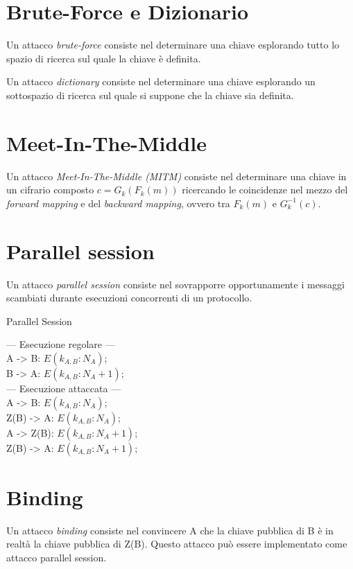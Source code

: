 \section{Brute-Force e Dizionario}
Un attacco \textit{brute-force} consiste nel determinare una chiave esplorando tutto lo spazio di ricerca sul quale la chiave è definita.

Un attacco \textit{dictionary} consiste nel determinare una chiave esplorando un sottospazio di ricerca sul quale si suppone che la chiave sia definita.

\section{Meet-In-The-Middle}
Un attacco \textit{Meet-In-The-Middle (MITM)} consiste nel determinare una chiave in un cifrario composto $c=G_{k}(F_{k}(m))$ ricercando le coincidenze nel mezzo del \textit{forward mapping} e del \textit{backward mapping}, ovvero tra $F_{k}(m)$ e $G_{k}^{-1}(c)$.

\section{Parallel session}
Un attacco \textit{parallel session} consiste nel sovrapporre opportunamente i messaggi scambiati durante esecuzioni concorrenti di un protocollo.

\bigskip
\begin{algorithm}[H]
  \caption{Parallel Session}
  \label{alg:attack-parallel-session}
  \SetAlgoNoLine
  --- Esecuzione regolare --- \\
  A -> B: $E(k_{A,B}:N_{A})$;\\
  B -> A: $E(k_{A,B}:N_{A}+1)$;\\
  --- Esecuzione attaccata --- \\
  A -> B: $E(k_{A,B}:N_{A})$;\\
  Z(B) -> A: $E(k_{A,B}:N_{A})$;\\
  A -> Z(B): $E(k_{A,B}:N_{A}+1)$;\\
  Z(B) -> A: $E(k_{A,B}:N_{A}+1)$;
\end{algorithm}

\section{Binding}
Un attacco \textit{binding} consiste nel convincere A che la chiave pubblica di B è in realtà la chiave pubblica di Z(B). Questo attacco può essere implementato come attacco parallel session.

